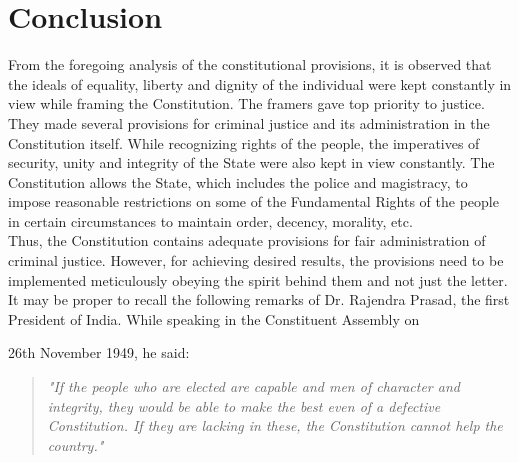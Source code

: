\documentclass[11pt]{article}
\begin{document}
\section{Conclusion}
From the foregoing analysis of the constitutional provisions, it is observed that the ideals of equality, liberty and dignity of the individual were kept constantly in view while framing the Constitution. The framers gave top priority to justice. They made several provisions for criminal justice and its administration in the Constitution itself. While recognizing rights of the people, the imperatives of security, unity and integrity of the State were also kept in view constantly. The Constitution allows the State, which includes the police and magistracy, to impose reasonable restrictions on some of the Fundamental Rights of the people in certain circumstances to maintain order, decency, morality, etc.\\

Thus, the Constitution contains adequate provisions for fair administration of criminal justice. However, for achieving desired results, the provisions need to be implemented meticulously obeying the spirit behind them and not just the letter. It may be proper to recall the following remarks of Dr. Rajendra Prasad, the first President of India. While speaking in the Constituent Assembly on

26th November 1949, he said:
\begin{quote}
	\textit{"If the people who are elected are capable and men of character and integrity, they would be able to make the best even of a defective Constitution. If they are lacking in these, the Constitution cannot help the country."}
\end{quote}
\end{document}
